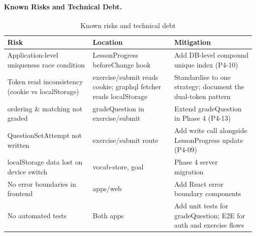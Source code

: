 \paragraph{Known Risks and Technical Debt.}

\begin{table}[H]
\centering
\begin{tabularx}{\linewidth}{X X X}
\toprule
Risk & Location & Mitigation \\
\midrule
Application-level uniqueness race condition & LessonProgress beforeChange hook & Add DB-level compound unique index (P4-10) \\
Token read inconsistency (cookie vs localStorage) & exercise/submit reads cookie; graphql fetcher reads localStorage & Standardise to one strategy; document the dual-token pattern \\
ordering \& matching not graded & gradeQuestion in exercise/submit & Extend gradeQuestion in Phase 4 (P4-13) \\
QuestionSetAttempt not written & exercise/submit route & Add write call alongside LessonProgress update (P4-09) \\
localStorage data lost on device switch & vocab-store, goal & Phase 4 server migration \\
No error boundaries in frontend & apps/web & Add React error boundary components \\
No automated tests & Both apps & Add unit tests for gradeQuestion; E2E for auth and exercise flows \\
\bottomrule
\end{tabularx}
\caption{Known risks and technical debt}
\end{table}
